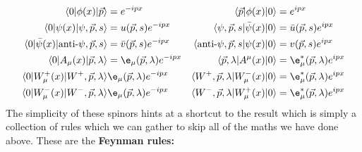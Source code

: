 \documentclass[a4paper, 11pt, normalem]{report}
\begin{document}
\begin{align}
    \langle0|\phi(x)|\vec{p}\rangle &= e^{-ipx} & \langle\vec{p}|\phi(x)|0\rangle &= e^{ipx} \\
    \langle0|\psi(x)|\psi,\vec{p},s\rangle &= u(\vec{p},s)e^{-ipx} & \langle\psi,\vec{p},s|\bar{\psi}(x)|0\rangle &= \bar{u}(\vec{p},s)e^{ipx} \\
    \langle0|\bar{\psi}(x)|\text{anti-}\psi,\vec{p},s\rangle &= \bar{v}(\vec{p},s)e^{-ipx} & \langle\text{anti-}\psi,\vec{p},s|\psi(x)|0\rangle &= v(\vec{p},s)e^{ipx} \\
    \langle0|A_\mu(x)|\vec{p},\lambda\rangle &= \e_\mu(\vec{p},\lambda)e^{-ipx} & \langle\vec{p},\lambda|A^\mu(x)|0\rangle &= \e_\mu^*(\vec{p},\lambda)e^{ipx} \\
    \langle0|W_\mu^+(x)|W^+,\vec{p},\lambda\rangle&\e_\mu(\vec{p},\lambda)e^{-ipx} & \langle W^+,\vec{p},\lambda|W_\mu^-(x)|0\rangle &= \e_\mu^*(\vec{p},\lambda)e^{ipx} \\
    \langle0|W_\mu^-(x)|W^-,\vec{p},\lambda\rangle&\e_\mu(\vec{p},\lambda)e^{-ipx} & \langle W^-,\vec{p},\lambda|W_\mu^+(x)|0\rangle &= \e_\mu^*(\vec{p},\lambda)e^{ipx}
\end{align}
The simplicity of these spinors hints at a shortcut to the result which is simply a collection of rules which we can gather to skip all of the maths we have done above.
These are the \textbf{Feynman rules:}
\end{document}

